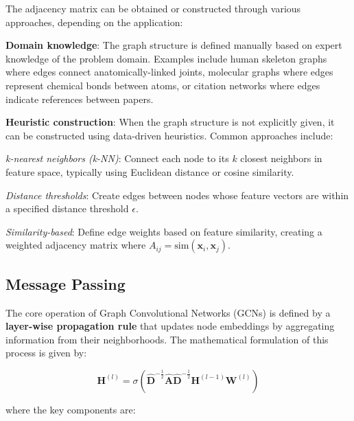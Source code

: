 The adjacency matrix can be obtained or constructed through various approaches, depending on the application:

\begin{compactitemize}
\item \textbf{Domain knowledge}: The graph structure is defined manually based on expert knowledge of the problem domain. Examples include human skeleton graphs where edges connect anatomically-linked joints, molecular graphs where edges represent chemical bonds between atoms, or citation networks where edges indicate references between papers.

\item \textbf{Heuristic construction}: When the graph structure is not explicitly given, it can be constructed using data-driven heuristics. Common approaches include:
\begin{compactitemize}
\item \textit{k-nearest neighbors (k-NN)}: Connect each node to its $k$ closest neighbors in feature space, typically using Euclidean distance or cosine similarity.
\item \textit{Distance thresholds}: Create edges between nodes whose feature vectors are within a specified distance threshold $\epsilon$.
\item \textit{Similarity-based}: Define edge weights based on feature similarity, creating a weighted adjacency matrix where $A_{ij} = \text{sim}(\mathbf{x}_i, \mathbf{x}_j)$.
\end{compactitemize}
\end{compactitemize}

\subsection{Message Passing}
The core operation of Graph Convolutional Networks (GCNs) is defined by a \textbf{layer-wise propagation rule} that updates node embeddings by aggregating information from their neighborhoods. The mathematical formulation of this process is given by:

$$\mathbf{H}^{(l)} = \sigma\left(\hat{\mathbf{D}}^{-\frac{1}{2}} \hat{\mathbf{A}} \hat{\mathbf{D}}^{-\frac{1}{2}} \mathbf{H}^{(l-1)} \mathbf{W}^{(l)}\right)$$

where the key components are:

